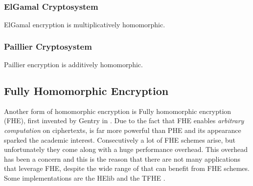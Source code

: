 \subsubsection{ElGamal Cryptosystem}\label{ss:elgamal}

ElGamal encryption is multiplicatively homomorphic.


\subsubsection{Paillier Cryptosystem}\label{ss:paillier}
Paillier encryption is additively homomorphic.


\subsection{Fully Homomorphic Encryption}\label{ss:fhe}
Another form of homomorphic encryption is Fully homomorphic encryption (FHE), first invented by Gentry in \cite{gentry2009fully}.
Due to the fact that FHE enables \textit{arbitrary computation} on ciphertexts, is far more powerful than PHE and its appearance sparked the academic interest.
Consecutively a lot of FHE schemes arise, but unfortunately they come along with a huge performance overhead.
This overhead has been a concern and this is the reason that there are not many applications that leverage FHE, despite the wide range of that can benefit from FHE schemes.
Some implementations are the HElib \cite{halevi2014algorithms} and the TFHE \cite{chillotti2016faster}.


